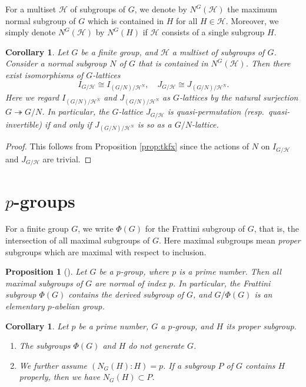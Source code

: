 \documentclass[12pt]{amsart}
\theoremstyle{plain}
\newtheorem{cor}[thm]{Corollary}
\newtheorem{prop}[thm]{Proposition}
\theoremstyle{definition}
\numberwithin{thm}{section}
\numberwithin{equation}{section}
\newcommand{\cH}{\mathcal{H}}
\begin{document}
For a multiset $\cH$ of subgroups of $G$, we denote by $N^{G}(\cH)$ the maximum normal subgroup of $G$ which is contained in $H$ for all $H\in \cH$. Moreover, we simply denote $N^{G}(\cH)$ by $N^{G}(H)$ if $\cH$ consists of a single subgroup $H$. 

\begin{cor}\label{cor:trfx}
Let $G$ be a finite group, and $\cH$ a multiset of subgroups of $G$. Consider a normal subgroup $N$ of $G$ that is contained in $N^{G}(\cH)$. Then there exist isomorphisms of $G$-lattices
\begin{equation*}
    I_{G/\cH}\cong I_{(G/N)/\cH^{N}},\quad J_{G/\cH}\cong J_{(G/N)/\cH^{N}}. 
\end{equation*}
Here we regard $I_{(G/N)/\cH^{N}}$ and $J_{(G/N)/\cH^{N}}$ as $G$-lattices by the natural surjection $G\twoheadrightarrow G/N$. In particular, the $G$-lattice $J_{G/\cH}$ is quasi-permutation (resp.~quasi-invertible) if and only if $J_{(G/N)/\cH^{N}}$ is so as a $G/N$-lattice. 
\end{cor}

\begin{proof}
This follows from Proposition \ref{prop:tkfx} since the actions of $N$ on $I_{G/\cH}$ and $J_{G/\cH}$ are trivial. 
\end{proof}

\section{$p$-groups}\label{sect:pgrp}

For a finite group $G$, we write $\Phi(G)$ for the Frattini subgroup of $G$, that is, the intersection of all maximal subgroups of $G$. Here maximal subgroups mean \emph{proper} subgroups which are maximal with respect to inclusion. 

\begin{prop}[{\cite[Theorem 4.3.2]{Hall1959}}]\label{prop:mxps}
Let $G$ be a $p$-group, where $p$ is a prime number. Then all maximal subgroups of $G$ are normal of index $p$. In particular, the Frattini subgroup $\Phi(G)$ contains the derived subgroup of $G$, and $G/\Phi(G)$ is an elementary $p$-abelian group. 
\end{prop}

\begin{cor}\label{cor:pgfg}
Let $p$ be a prime number, $G$ a $p$-group, and $H$ its proper subgroup. 
\begin{enumerate}
\item The subgroups $\Phi(G)$ and $H$ do not generate $G$. 
\item We further assume $(N_{G}(H):H)=p$. If a subgroup $P$ of $G$ contains $H$ properly, then we have $N_{G}(H)\subset P$. 
\end{enumerate}
\end{cor}
\end{document}
